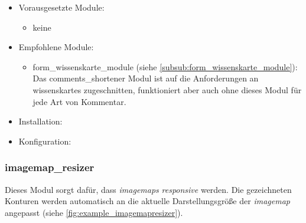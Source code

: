 \begin{itemize}[parsep=0pt, itemsep=5.0pt plus 2.0pt minus 1.0pt, leftmargin=*]
	\item Vorausgesetzte Module: 
	
	\begin{itemize}
		\item keine
	\end{itemize}


	\item Empfohlene Module:

	\begin{itemize}
		\item form\_wissenskarte\_module (siehe \cref{subsub:form_wissenskarte_module}): Das comments\_shortener Modul ist auf die Anforderungen an \glspl{wissenskarte} zugeschnitten, funktioniert aber auch ohne dieses Modul für jede Art von Kommentar.
	\end{itemize}


	\item Installation: \standardinstall

	\item Konfiguration:

	\noconfig

\end{itemize}



\newpage
\subsubsection{imagemap\_resizer}\label{subsub:imagemapresizer}
Dieses Modul sorgt dafür, dass \textit{\glspl{imagemap}} \textit{responsive} werden. Die gezeichneten Konturen werden automatisch an die aktuelle Darstellungsgröße der \textit{\gls{imagemap}} angepasst (siehe \cref{fig:example_imagemapresizer}).

